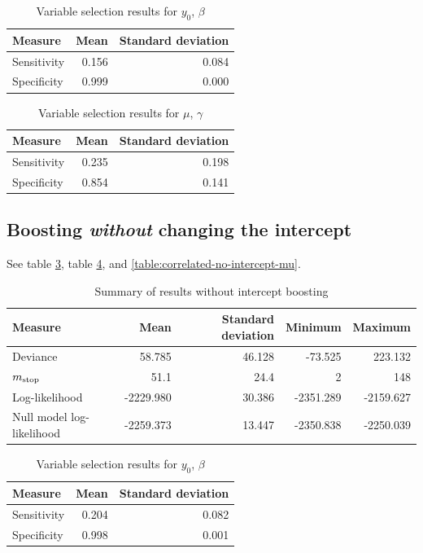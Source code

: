 \begin{table}\caption{Variable selection results for $y_0$, $\beta$}\label{table:correlated-intercept-y0}
\begin{tabular}{l|rr}
Measure &  Mean &    Standard deviation \\
\hline
Sensitivity & 0.156 & 0.084 \\
Specificity & 0.999 & 0.000
\end{tabular}
\end{table}


\begin{table}\caption{Variable selection results for $\mu$, $\gamma$}\label{table:correlated-intercept-mu}
\begin{tabular}{l|rr}
Measure     & Mean   & Standard deviation     \\
\hline
Sensitivity & 0.235 & 0.198 \\
Specificity & 0.854 & 0.141
\end{tabular}
\end{table}

\subsection{Boosting \textit{without} changing the intercept}
See table \ref{table:correlated-no-intercept-summary}, table \ref{table:correlated-no-intercept-y0}, and \ref{table:correlated-no-intercept-mu}.
\begin{table}\caption{Summary of results without intercept boosting}\label{table:correlated-no-intercept-summary}
\begin{tabular}{l|rrrr}
Measure &    Mean &     Standard deviation &  Minimum & Maximum \\
\hline
Deviance    &    58.785 & 46.128 &   -73.525 &   223.132 \\
$m_{\text{stop}}$      &    51.1 & 24.4 &     2 &   148 \\
Log-likelihood      & -2229.980 & 30.386 & -2351.289 & -2159.627 \\
Null model log-likelihood & -2259.373 & 13.447 & -2350.838 & -2250.039
\end{tabular}
\end{table}

\begin{table}\caption{Variable selection results for $y_0$, $\beta$}\label{table:correlated-no-intercept-y0}
\begin{tabular}{l|rr}
Measure &  Mean &    Standard deviation \\
\hline
Sensitivity & 0.204 & 0.082 \\
Specificity & 0.998 & 0.001
\end{tabular}
\end{table}


